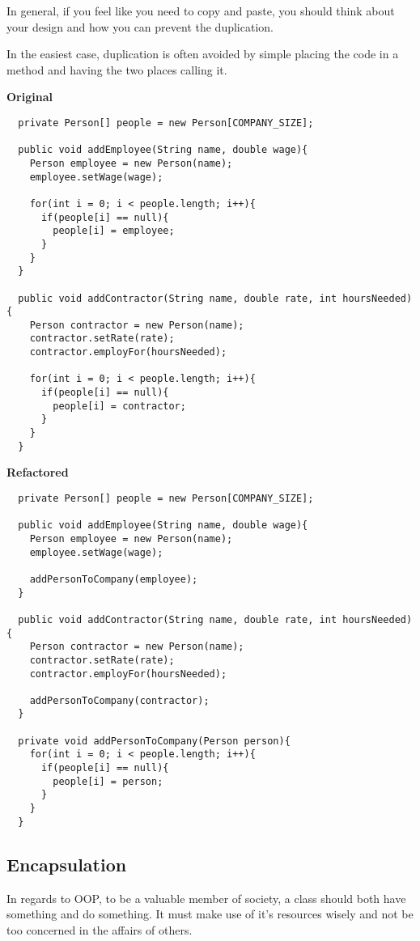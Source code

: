 \documentclass{article}
\begin{document}
  In general, if you feel like you need to copy and paste, you should think
  about your design and how you can prevent the duplication.

  In the easiest case, duplication is often avoided by simple placing the code
  in a method and having the two places calling it.

  \textbf{Original}
  \begin{verbatim}
  private Person[] people = new Person[COMPANY_SIZE];

  public void addEmployee(String name, double wage){
    Person employee = new Person(name);
    employee.setWage(wage);
    
    for(int i = 0; i < people.length; i++){
      if(people[i] == null){
        people[i] = employee;
      }
    }
  }

  public void addContractor(String name, double rate, int hoursNeeded){
    Person contractor = new Person(name);
    contractor.setRate(rate);
    contractor.employFor(hoursNeeded);
    
    for(int i = 0; i < people.length; i++){
      if(people[i] == null){
        people[i] = contractor;
      }
    }
  }
  \end{verbatim}

  \textbf{Refactored}
  \begin{verbatim}
  private Person[] people = new Person[COMPANY_SIZE];

  public void addEmployee(String name, double wage){
    Person employee = new Person(name);
    employee.setWage(wage);
    
    addPersonToCompany(employee);
  }

  public void addContractor(String name, double rate, int hoursNeeded){
    Person contractor = new Person(name);
    contractor.setRate(rate);
    contractor.employFor(hoursNeeded);
    
    addPersonToCompany(contractor);
  }

  private void addPersonToCompany(Person person){
    for(int i = 0; i < people.length; i++){
      if(people[i] == null){
        people[i] = person;
      }
    }
  }
  \end{verbatim}

  \subsection*{Encapsulation}
  In regards to OOP, to be a valuable member of society, a class should both have something and
  do something. It must make use of it's resources wisely and not be too
  concerned in the affairs of others.
\end{document}
